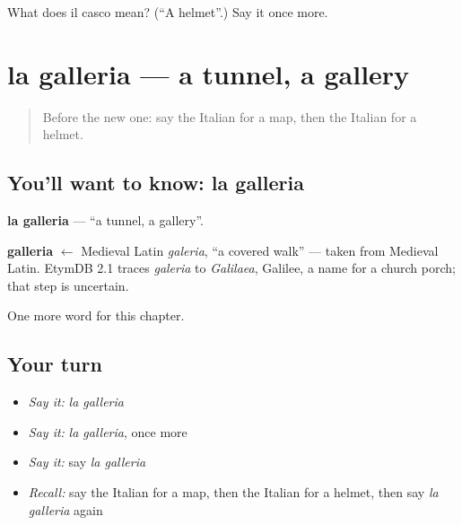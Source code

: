 \begin{tcolorbox}[breakable,colback=teal!4,colframe=teal!35!black,title={Before you move on}]
What does il casco mean? (\textquotedblleft{}A helmet\textquotedblright{}.) Say it once more.
\end{tcolorbox}
\section[la galleria]{la galleria — a tunnel, a gallery}

\label{lesson:IT-C199-galleria}



\begin{quote}
Before the new one: say the Italian for a map, then the Italian for a helmet.
\end{quote}

\subsection*{You'll want to know: la galleria}
\textbf{la galleria} — \textquotedblleft{}a tunnel, a gallery\textquotedblright{}.

\begin{cousinweb}
\textbf{galleria} $\leftarrow$ Medieval Latin \emph{galeria}, \textquotedblleft{}a covered walk\textquotedblright{} — taken from Medieval Latin. EtymDB 2.1 traces \emph{galeria} to \emph{Galilaea}, Galilee, a name for a church porch; that step is uncertain.
\end{cousinweb}

\begin{grammarlens}[title={What you've built}]
One more word for this chapter.
\end{grammarlens}

\subsection*{Your turn}
\begin{itemize}
\raggedright
  \item \emph{Say it:} \emph{la galleria}
  \item \emph{Say it:} \emph{la galleria}, once more
  \item \emph{Say it:} say \emph{la galleria}
  \item \emph{Recall:} say the Italian for a map, then the Italian for a helmet, then say \emph{la galleria} again
\end{itemize}

